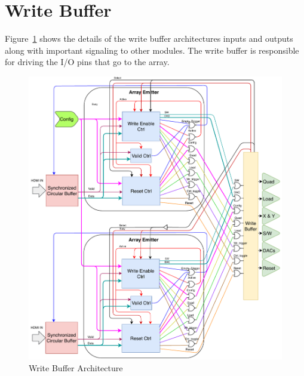 \section{Write Buffer}
     Figure~\ref{fig:wb_arch} shows the details of the write buffer architectures inputs and outputs along with important signaling to other modules. The write buffer is responsible for driving the I/O pins that go to the array.

    \begin{figure}
        \centering
        \includegraphics[width=1.0\textwidth]{fig/pdp_wb_arch.pdf}
        \caption{Write Buffer Architecture}
        \label{fig:wb_arch}
    \end{figure}

